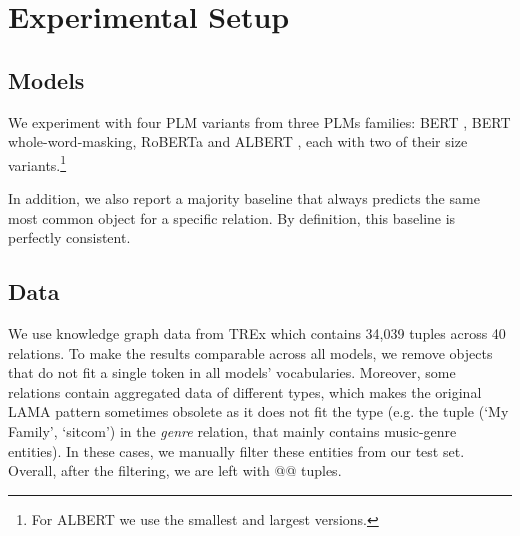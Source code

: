 \section{Experimental Setup}
\label{sec:setup}

\subsection{Models}
We experiment with four PLM variants from three PLMs families: BERT \cite{bert}, BERT whole-word-masking, RoBERTa \cite{roberta} and ALBERT \cite{albert}, each with two of their  size variants.\footnote{For ALBERT we use the smallest and largest versions.}

In addition, we also report a majority baseline that always predicts the same most common object for a specific relation. By definition, this baseline is perfectly consistent.

\subsection{Data}



We use knowledge graph data from TREx \cite{trex} which contains 34,039 tuples across 40 relations. To make the results comparable across all models, we remove objects that do not fit a single token in all models' vocabularies. Moreover, some relations contain aggregated data of different types, which makes the original LAMA pattern sometimes obsolete as it does not fit the type (e.g. the tuple (`My Family', `sitcom') in the \textit{genre} relation, that mainly contains music-genre entities). In these cases, we manually filter these entities from our test set.
Overall, after the filtering, we are left with @@ tuples.



